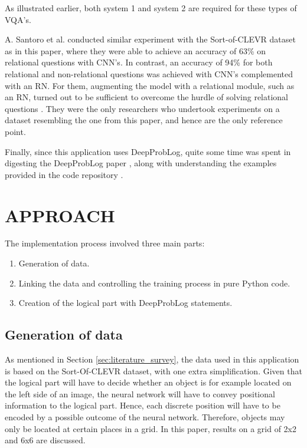 \documentclass[english]{sobraep}
\begin{document}
As illustrated earlier, both system 1 and system 2 are required for these types of VQA's.

A. Santoro et al. conducted similar experiment with the Sort-of-CLEVR dataset as in this paper, where they were able to achieve an accuracy of 63\% on relational questions with CNN's. In contrast, an accuracy of 94\% for both relational and non-relational questions was achieved with CNN's complemented with an RN. For them, augmenting the model with a relational module, such as an RN, turned out to be sufficient to overcome the hurdle of solving relational questions \cite{sort_of_clevr_dataset}. They were the only researchers who undertook experiments on a dataset resembling the one from this paper, and hence are the only reference point.

Finally, since this application uses DeepProbLog, quite some time was spent in digesting the DeepProbLog paper \cite{deepproblog}, along with understanding the  examples provided in the code repository \cite{deepproblog_code}.

\section{APPROACH}
\label{sec:approach}
The implementation process involved three main parts:
\begin{enumerate}
    \item Generation of data.
    \item Linking the data and controlling the training process in pure Python code.
    \item Creation of the logical part with DeepProbLog statements.
\end{enumerate}

\subsection{Generation of data}
As mentioned in Section \ref{sec:literature_survey}, the data used in this application is based on the Sort-Of-CLEVR dataset, with one extra simplification. Given that the logical part will have to decide whether an object is for example located on the left side of an image, the neural network will have to convey positional information to the logical part. Hence, each discrete position will have to be encoded by a possible outcome of the neural network. Therefore, objects may only be located at certain places in a grid. In this paper, results on a grid of 2x2 and 6x6 are discussed.
\end{document}
